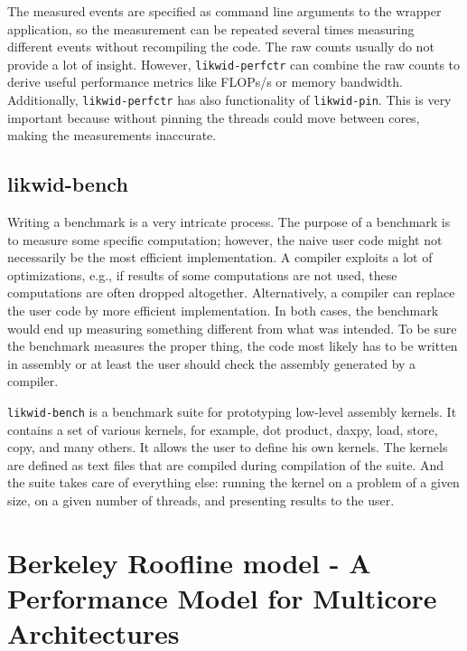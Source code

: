 The measured events are specified as command line arguments to the wrapper application, so the measurement can be repeated several times measuring different events without recompiling the code.
The raw counts usually do not provide a lot of insight. However, \texttt{likwid-perfctr} can combine the raw counts to derive useful performance metrics like FLOPs/s or memory bandwidth.
%
Additionally, \texttt{likwid-perfctr} has also functionality of \texttt{likwid-pin}. This is very important because without pinning the threads could move between cores, making the measurements inaccurate.

\subsection*{likwid-bench}

Writing a benchmark is a very intricate process. The purpose of a benchmark is to measure some specific computation; however, the naive user code might not necessarily be the most efficient implementation. A compiler exploits a lot of optimizations, e.g., if results of some computations are not used, these computations are often dropped altogether. Alternatively, a compiler can replace the user code by more efficient implementation. In both cases, the benchmark would end up measuring something different from what was intended.
To be sure the benchmark measures the proper thing, the code most likely has to be written in assembly or at least the user should check the assembly generated by a compiler.

\texttt{likwid-bench} is a benchmark suite for prototyping low-level assembly kernels. 
It contains a set of various kernels, for example, dot product, daxpy, load, store, copy, and many others. It allows the user to define his own kernels. The kernels are defined as text files that are compiled during compilation of the suite. And the suite takes care of everything else: running the kernel on a problem of a given size, on a given number of threads, and presenting results to the user.

\section[Berkeley Roofline model]{Berkeley Roofline model - A Performance Model for Multicore Architectures}
\label{sec:roofline}

